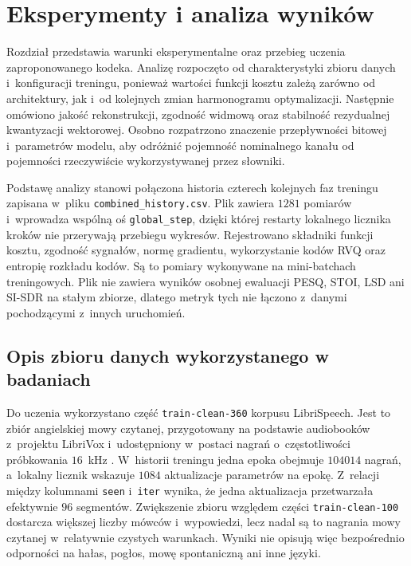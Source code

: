 \chapter{Eksperymenty i analiza wyników}
\label{ch:eksperymenty}

\providecommand{\notarysunku}[1]{%
\par\smallskip
\begin{minipage}{0.90\textwidth}
\footnotesize\raggedright\emph{#1}
\end{minipage}\par
}

Rozdział przedstawia warunki eksperymentalne oraz przebieg uczenia zaproponowanego kodeka. Analizę rozpoczęto od charakterystyki zbioru danych i~konfiguracji treningu, ponieważ wartości funkcji kosztu zależą zarówno od architektury, jak i~od kolejnych zmian harmonogramu optymalizacji. Następnie omówiono jakość rekonstrukcji, zgodność widmową oraz stabilność rezydualnej kwantyzacji wektorowej. Osobno rozpatrzono znaczenie przepływności bitowej i~parametrów modelu, aby odróżnić pojemność nominalnego kanału od pojemności rzeczywiście wykorzystywanej przez słowniki.

Podstawę analizy stanowi połączona historia czterech kolejnych faz treningu zapisana w~pliku \texttt{combined\_history.csv}. Plik zawiera \(1281\) pomiarów i~wprowadza wspólną oś \texttt{global\_step}, dzięki której restarty lokalnego licznika kroków nie przerywają przebiegu wykresów. Rejestrowano składniki funkcji kosztu, zgodność sygnałów, normę gradientu, wykorzystanie kodów RVQ oraz entropię rozkładu kodów. Są to pomiary wykonywane na mini-batchach treningowych. Plik nie zawiera wyników osobnej ewaluacji PESQ, STOI, LSD ani SI-SDR na stałym zbiorze, dlatego metryk tych nie łączono z~danymi pochodzącymi z~innych uruchomień.

\section{Opis zbioru danych wykorzystanego w badaniach}
\label{sec:zbior-danych}

Do uczenia wykorzystano część \texttt{train-clean-360} korpusu LibriSpeech. Jest to zbiór angielskiej mowy czytanej, przygotowany na podstawie audiobooków z~projektu LibriVox i~udostępniony w~postaci nagrań o~częstotliwości próbkowania \(16\)~kHz \cite{Panayotov2015LibriSpeech}. W~historii treningu jedna epoka obejmuje \(104014\) nagrań, a~lokalny licznik wskazuje \(1084\) aktualizacje parametrów na epokę. Z~relacji między kolumnami \texttt{seen} i~\texttt{iter} wynika, że jedna aktualizacja przetwarzała efektywnie \(96\) segmentów. Zwiększenie zbioru względem części \texttt{train-clean-100} dostarcza większej liczby mówców i~wypowiedzi, lecz nadal są to nagrania mowy czytanej w~relatywnie czystych warunkach. Wyniki nie opisują więc bezpośrednio odporności na hałas, pogłos, mowę spontaniczną ani inne języki.

